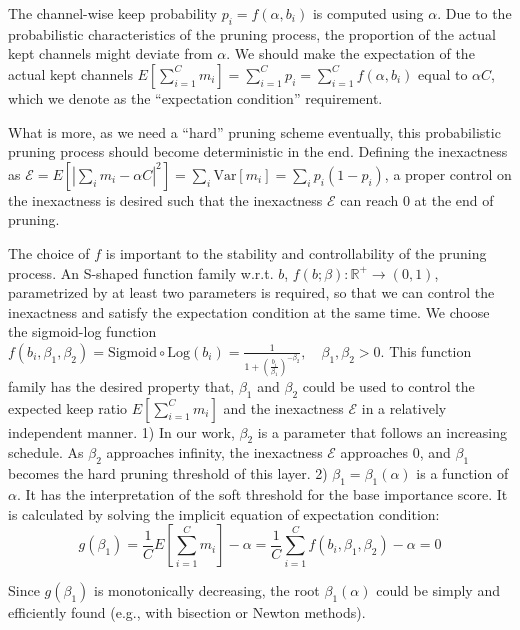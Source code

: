 \documentclass[runningheads]{llncs}
\newcommand{\inexactness}{\mathcal{E}}
\begin{document}
  The channel-wise keep probability $p_i = f(\alpha, b_i)$ is computed using $\alpha$. 
  Due to the probabilistic characteristics of the pruning process, the proportion of the actual kept channels might deviate from $\alpha$. We should make the expectation of the actual kept channels $E[\sum_{i=1}^C m_i] = \sum_{i=1}^C p_i =\sum_{i=1}^C f(\alpha, b_i)$ equal to $\alpha C$, which we denote as the ``expectation condition'' requirement.
  
  What is more, as we need a ``hard'' pruning scheme eventually, this probabilistic pruning process should become deterministic in the end. Defining the inexactness as $\inexactness = E[|\sum_i m_i - \alpha C|^2] = \sum_i \mbox{Var}[m_i] = \sum_i p_i (1-p_i)$, 
  a proper control on the inexactness is desired such that the inexactness $\inexactness$ can reach $0$ at the end of pruning. 
  
  The choice of $f$ is important to the stability and controllability of the pruning process. An S-shaped function family w.r.t. $b$, $f(b;\beta): \mathbb{R}^+ \to (0, 1)$, parametrized by at least two parameters is required, so that we can control the inexactness and satisfy the expectation condition at the same time.
  We choose the sigmoid-log function $f(b_i, \beta_1, \beta_2) = \mbox{Sigmoid} \circ \mbox{Log}(b_i) =  \frac{1}{1 + (\frac{b_i}{\beta_1})^{-\beta_2}}, \quad \beta_1, \beta_2 > 0$. This function family has the desired property that, 
  $\beta_1$ and $\beta_2$ could be used to control the expected keep ratio $E[\sum_{i=1}^C m_i]$ and the inexactness $\inexactness$ in a relatively independent manner. 1) In our work, $\beta_2$ is a parameter that follows an increasing schedule. As $\beta_2$ approaches infinity, the inexactness $\inexactness$ approaches 0, and $\beta_1$ becomes the hard pruning threshold of this layer.
  2) $\beta_1 = \beta_1(\alpha)$ is a function of $\alpha$. It has the interpretation of the soft threshold for the base importance score. It is calculated by solving the implicit equation of expectation condition: 
  \begin{equation}
      g(\beta_1) = \frac{1}{C} E[\sum_{i=1}^C m_i] - \alpha = \frac{1}{C} \sum_{i=1}^{C} f(b_i, \beta_1, \beta_2) - \alpha = 0
      \label{eq:beta1_eq}
    \end{equation}
    
  Since $g(\beta_1)$ is monotonically decreasing, the root $\beta_1(\alpha)$ could be simply and efficiently found (e.g., with bisection or Newton methods).
  
\end{document}
